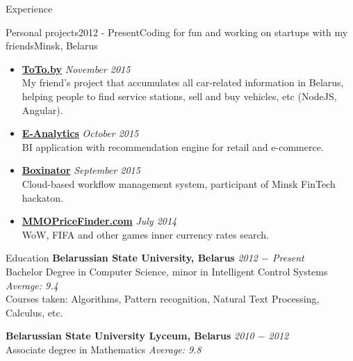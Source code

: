 \documentclass{resume} %
\begin{document}
\begin{rSection}{Experience}
\begin{rSubsection}{Personal projects}{2012 - Present}{Coding for fun and working on startups with my friends}{Minsk, Belarus}
\begin{itemize}[leftmargin=*,label={$+$}]
  \item {\bf \href{http://toto.by}{ToTo.by}} \hfill {\em November 2015}  \\
	My friend's project that accumulates all car-related information in Belarus, helping people to find service stations, sell and buy vehicles, etc (NodeJS, Angular).

  \item {\bf \href{http://pirateminds.com/e-analytics}{E-Analytics}} \hfill {\em October 2015} \\
	BI application with recommendation engine for retail and e-commerce.

  \item {\bf \href{http://boxinator.xyz}{Boxinator}} \hfill {\em September 2015} \\
	Cloud-based workflow management system, participant of Minsk FinTech hackaton.

  \item {\bf \href{http://mmopricefinder.com}{MMOPriceFinder.com}} \hfill {\em July 2014} \\
	WoW, FIFA and other games inner currency rates search.

\end{itemize}
\end{rSubsection}
\end{rSection}


\begin{rSection}{Education}
{\bf Belarussian State University, Belarus} \hfill {\em 2012 $-$ Present} \\
Bachelor Degree in Computer Science, minor in Intelligent Control Systems \hfill {\em Average: 9.4} \\
Courses taken: Algorithms, Pattern recognition, Natural Text Processing, Calculus, etc.

{\bf Belarussian State University Lyceum, Belarus} \hfill {\em 2010 $-$ 2012} \\
Associate degree in Mathematics \hfill {\em Average: 9.8}

\end{rSection}

\end{document}
